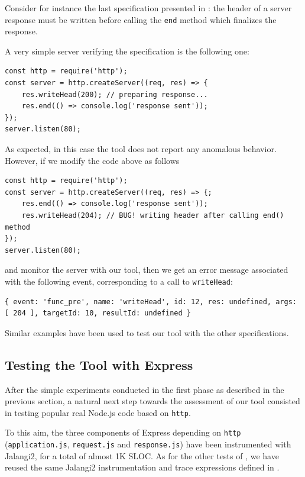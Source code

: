 Consider for instance the last specification presented in :
the header of a server response must be written before calling the \lstinline{end} method which finalizes the response.

A very simple server verifying the specification is the following one:
\begin{lstlisting}
const http = require('http');
const server = http.createServer((req, res) => {
	res.writeHead(200); // preparing response...
	res.end(() => console.log('response sent'));
});
server.listen(80);
\end{lstlisting}

As expected, in this case the tool does not report any anomalous behavior.
However, if we modify the code above as follows
\begin{lstlisting}
const http = require('http');
const server = http.createServer((req, res) => {;
	res.end(() => console.log('response sent'));
	res.writeHead(204); // BUG! writing header after calling end() method
});
server.listen(80);
\end{lstlisting}
and monitor the server with our tool, then we get an error message associated with the following event, corresponding
to a call to \lstinline{writeHead}:
\begin{lstlisting}
{ event: 'func_pre', name: 'writeHead', id: 12, res: undefined, args: [ 204 ], targetId: 10, resultId: undefined }
\end{lstlisting}

Similar examples have been used to test our tool with the other specifications.

\subsection{Testing the Tool with Express}\label{sec:express}

After the simple experiments conducted in the first phase as described in the previous section,
a natural next step towards the assessment of our tool consisted in testing popular real Node.js code
based on \lstinline{http}.

To this aim, the three components of Express depending on \lstinline{http} (\lstinline{application.js}, \lstinline{request.js} and
\lstinline{response.js}) have been instrumented with Jalangi2, for a total of almost 1K SLOC.
As for the other tests of , we have reused the same Jalangi2 instrumentation and trace expressions defined in .

